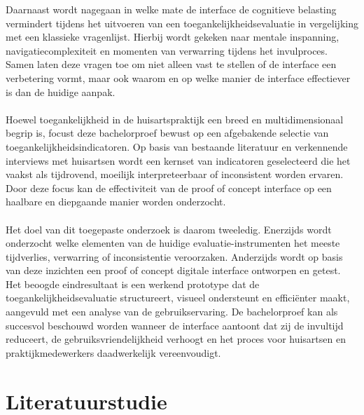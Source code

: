 Daarnaast wordt nagegaan in welke mate de interface de cognitieve belasting vermindert tijdens het uitvoeren van een toegankelijkheidsevaluatie in vergelijking met een klassieke vragenlijst.
Hierbij wordt gekeken naar mentale inspanning, navigatiecomplexiteit en momenten van verwarring tijdens het invulproces.
Samen laten deze vragen toe om niet alleen vast te stellen of de interface een verbetering vormt,
maar ook waarom en op welke manier de interface effectiever is dan de huidige aanpak.\\\\

Hoewel toegankelijkheid in de huisartspraktijk een breed en multidimensionaal begrip is,
focust deze bachelorproef bewust op een afgebakende selectie van toegankelijkheidsindicatoren.
Op basis van bestaande literatuur en verkennende interviews met huisartsen wordt een kernset van indicatoren geselecteerd die het vaakst als tijdrovend,
moeilijk interpreteerbaar of inconsistent worden ervaren.
Door deze focus kan de effectiviteit van de proof of concept interface op een haalbare en diepgaande manier worden onderzocht.\\\\

Het doel van dit toegepaste onderzoek is daarom tweeledig. 
Enerzijds wordt onderzocht welke elementen van de huidige evaluatie-instrumenten het meeste tijdverlies, verwarring of inconsistentie veroorzaken.
Anderzijds wordt op basis van deze inzichten een proof of concept digitale interface ontworpen en getest.
Het beoogde eindresultaat is een werkend prototype dat de toegankelijkheidsevaluatie structureert, visueel ondersteunt en efficiënter maakt, aangevuld met een analyse van de gebruikservaring.
De bachelorproef kan als succesvol beschouwd worden wanneer de interface aantoont dat zij de invultijd reduceert, de gebruiksvriendelijkheid verhoogt en het proces voor huisartsen en praktijkmedewerkers daadwerkelijk vereenvoudigt.

\section{Literatuurstudie}%
\label{sec:literatuurstudie}


